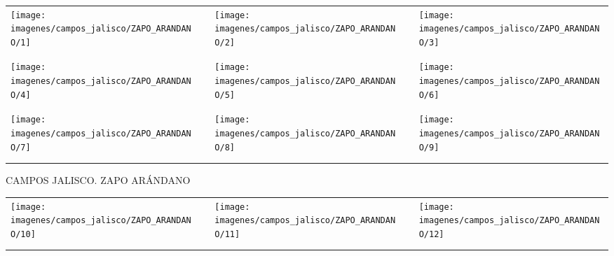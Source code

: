 \documentclass[10pt,letter]{report}
\begin{document}
\begin{table}[H]
\centering

\footnotesize
	\begin{tabular}{m{5cm}m{1cm}m{5cm}m{1cm}m{5cm}}
	
	\texttt{[image: imagenes/campos\_jalisco/ZAPO\_ARANDANO/1]}&&\texttt{[image: imagenes/campos\_jalisco/ZAPO\_ARANDANO/2]}&&\texttt{[image: imagenes/campos\_jalisco/ZAPO\_ARANDANO/3]}\\
	\\
	\\
	\texttt{[image: imagenes/campos\_jalisco/ZAPO\_ARANDANO/4]}&&\texttt{[image: imagenes/campos\_jalisco/ZAPO\_ARANDANO/5]}&&\texttt{[image: imagenes/campos\_jalisco/ZAPO\_ARANDANO/6]}\\
	\\
	\\
	\texttt{[image: imagenes/campos\_jalisco/ZAPO\_ARANDANO/7]}&&\texttt{[image: imagenes/campos\_jalisco/ZAPO\_ARANDANO/8]}&&\texttt{[image: imagenes/campos\_jalisco/ZAPO\_ARANDANO/9]}\\
	\\	
	\\
	
	\end{tabular}
	
\end{table}
\newpage

\begin{center}
	\textcolor{principal}{CAMPOS JALISCO. ZAPO AR\'ANDANO}
\end{center}
\begin{table}[H]
\centering

\footnotesize
	\begin{tabular}{m{5cm}m{1cm}m{5cm}m{1cm}m{5cm}}
	
	\texttt{[image: imagenes/campos\_jalisco/ZAPO\_ARANDANO/10]}&&\texttt{[image: imagenes/campos\_jalisco/ZAPO\_ARANDANO/11]}&&\texttt{[image: imagenes/campos\_jalisco/ZAPO\_ARANDANO/12]}\\
	\\
	\\

	
	\end{tabular}
	
\end{table}
\newpage

\newcommand{\carpetaa}{campos_jalisco}
\newcommand{\carpeta}{ZAPO_FRAMBUESA}
\end{document}
